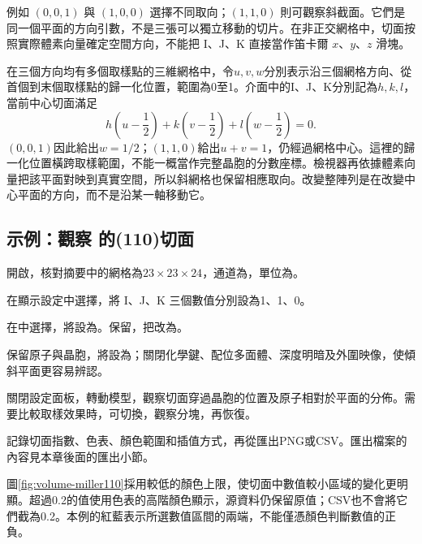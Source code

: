 例如 $(0,0,1)$ 與 $(1,0,0)$ 選擇不同取向；$(1,1,0)$ 則可觀察斜截面。它們是同一個平面的方向引數，不是三張可以獨立移動的切片。在非正交網格中，切面按照實際體素向量確定空間方向，不能把 I、J、K 直接當作笛卡爾 $x$、$y$、$z$ 滑塊。


在三個方向均有多個取樣點的三維網格中，令$u,v,w$分別表示沿三個網格方向、從首個到末個取樣點的歸一化位置，範圍為0至1。介面中的I、J、K分別記為$h,k,l$，當前中心切面滿足
\begin{equation}
  h\left(u-\frac12\right)
  +k\left(v-\frac12\right)
  +l\left(w-\frac12\right)=0.
  \label{eq:volume-central-miller}
\end{equation}
$(0,0,1)$因此給出$w=1/2$；$(1,1,0)$給出$u+v=1$，仍經過網格中心。這裡的歸一化位置橫跨取樣範圍，不能一概當作完整晶胞的分數座標。檢視器再依據體素向量把該平面對映到真實空間，所以斜網格也保留相應取向。改變整陣列是在改變中心平面的方向，而不是沿某一軸移動它。

\subsection{示例：觀察  的(110)切面}

\begin{steps}
  \item 開啟，核對摘要中的網格為$23\times23\times24$，通道為，單位為。
  \item 在顯示設定中選擇，將 I、J、K 三個數值分別設為1、1、0。
  \item 在中選擇，將設為。保留，把改為。
  \item 保留原子與晶胞，將設為；關閉化學鍵、配位多面體、深度明暗及外圍映像，使傾斜平面更容易辨認。
  \item 關閉設定面板，轉動模型，觀察切面穿過晶胞的位置及原子相對於平面的分佈。需要比較取樣效果時，可切換，觀察分塊，再恢復。
  \item 記錄切面指數、色表、顏色範圍和插值方式，再從匯出PNG或CSV。匯出檔案的內容見本章後面的匯出小節。
\end{steps}

圖\ref{fig:volume-miller110}採用較低的顏色上限，使切面中數值較小區域的變化更明顯。超過0.2的值使用色表的高階顏色顯示，源資料仍保留原值；CSV也不會將它們截為0.2。本例的紅藍表示所選數值區間的兩端，不能僅憑顏色判斷數值的正負。

